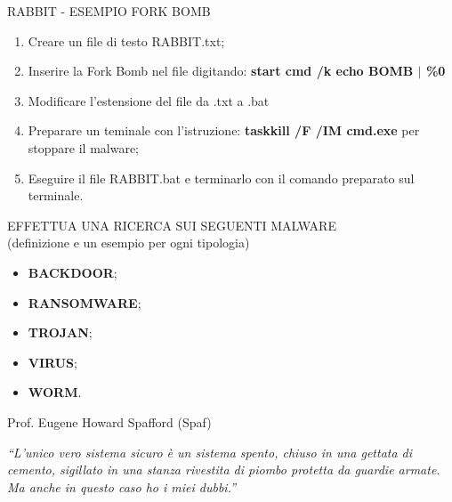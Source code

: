 \documentclass[aspectratio=1610]{beamer}
\begin{document}
\begin{frame}{RABBIT - ESEMPIO FORK BOMB}
    \begin{enumerate}
        \item Creare un file di testo RABBIT.txt;
        \pause
        \item Inserire la Fork Bomb nel file digitando: \textbf{start cmd /k echo BOMB \textbf{$\mid$} \%0}
        \pause
        \item Modificare l’estensione del ﬁle da .txt a .bat
        \pause
        \item Preparare un teminale con l'istruzione: \textbf{taskkill /F /IM cmd.exe} per stoppare il malware;
        \pause
        \item Eseguire il file RABBIT.bat e terminarlo con il comando preparato sul terminale.
    \end{enumerate}                        
\end{frame}

\begin{frame}{EFFETTUA UNA RICERCA SUI SEGUENTI MALWARE\\(definizione e un esempio per ogni tipologia)}
    \begin{itemize}
        \item \textbf{BACKDOOR};
        \item \textbf{RANSOMWARE};
        \item \textbf{TROJAN};
        \item \textbf{VIRUS};
        \item \textbf{WORM}.
    \end{itemize}                        
\end{frame}

\begin{frame}{Prof. Eugene Howard Spafford (Spaf)}
    \begin{minipage}{0.98\linewidth}
        \centering
        \huge
        \textit{``L’unico vero sistema sicuro è un sistema spento, chiuso in una gettata di cemento, 
        sigillato in una stanza rivestita di piombo protetta da guardie armate. 
        Ma anche in questo caso ho i miei dubbi.''}
    \end{minipage}
\end{frame}
\end{document}
